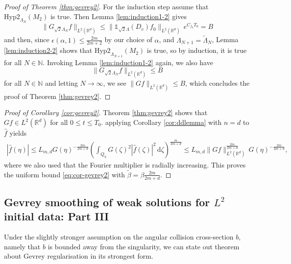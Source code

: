 \documentclass[11pt,a4paper,reqno]{amsart}
\theoremstyle{plain}
\theoremstyle{definition}
\begin{document}
\begin{proof}[Proof of Theorem \ref{thm:gevrey2}]
  For the induction step assume that $\mathrm{Hyp2}_{\Lambda_N}(M_2)$ is true. Then Lemma \ref{lem:induction1-2} gives
  \begin{equation*}
  	\| G_{\sqrt{2}\Lambda_N} f\|_{L^2({\mathbb{R}}^d)} \le \|{\mathds{1}}_{\sqrt{2}\Lambda}(D_v) f_0\|_{L^2({\mathbb{R}}^d)} \, e^{C_{f_0}T_0} = B
  \end{equation*}
  and then, since $\epsilon(\alpha,1)\le \frac{2m}{2m+2}$ by our choice of $\alpha$, and
  $\Lambda_{N+1}= \widetilde{\Lambda}_N$, Lemma \ref{lem:induction2-2} shows that  $\mathrm{Hyp2}_{\Lambda_{N+1}}(M_2)$ is true, so by induction, it is true for all $N\in{\mathbb{N}}$.
  Invoking Lemma \ref{lem:induction1-2} again, we also have
  \begin{equation*}
  	\|G_{\sqrt{2}\Lambda_N}f\|_{L^2({\mathbb{R}}^d)} \leq B
  \end{equation*}
  for all $N\in{\mathbb{N}}$ and letting $N\to\infty$, we see
  $\|Gf\|_{L^2({\mathbb{R}}^d)} \leq B $, which concludes the proof of Theorem \ref{thm:gevrey2}.
\end{proof}

\begin{proof}[Proof of Corollary \ref{cor:gevrey2}]
Theorem \ref{thm:gevrey2} shows that $Gf\in L^{2}({\mathbb{R}}^d)$ for all $0\leq t\leq T_0$. applying Corollary \ref{cor:ddlemma} with $n=d$ to $\hat{f}$ yields
\begin{align*}
	|\hat{f}(\eta)| \leq L_{m,d} G(\eta)^{-\frac{2m}{2m+d}} \left( \int_{Q_{\eta}} G(\zeta)^2 |\hat{f}(\zeta)|^2\,\mathrm{d}\zeta \right)^{\frac{m}{2m+d}} \leq L_{m,d} \|Gf\|_{L^2({\mathbb{R}}^d)}^{\frac{2m}{2m+d}}\, G(\eta)^{-\frac{2m}{2m+d}},
\end{align*}
where we also used that the Fourier multiplier is radially increasing. This proves the uniform bound \eqref{eq:cor-gevrey2} with $\widetilde{\beta} = \beta \frac{2m}{2m+d}$.
\end{proof}

\subsection{Gevrey smoothing of weak solutions for $L^2$ initial data: Part III}\label{subsec:partiii}

Under the slightly stronger assumption on the angular collision cross-section $b$, namely that $b$ is bounded away from the singularity, we can state out theorem about Gevrey regularisation in its strongest form.
\end{document}
